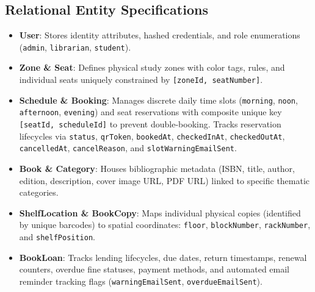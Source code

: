 \subsection{Relational Entity Specifications}
\begin{itemize}
    \item \textbf{User}: Stores identity attributes, hashed credentials, and role enumerations (\texttt{admin}, \texttt{librarian}, \texttt{student}).
    \item \textbf{Zone \& Seat}: Defines physical study zones with color tags, rules, and individual seats uniquely constrained by \texttt{[zoneId, seatNumber]}.
    \item \textbf{Schedule \& Booking}: Manages discrete daily time slots (\texttt{morning}, \texttt{noon}, \texttt{afternoon}, \texttt{evening}) and seat reservations with composite unique key \texttt{[seatId, scheduleId]} to prevent double-booking. Tracks reservation lifecycles via \texttt{status}, \texttt{qrToken}, \texttt{bookedAt}, \texttt{checkedInAt}, \texttt{checkedOutAt}, \texttt{cancelledAt}, \texttt{cancelReason}, and \texttt{slotWarningEmailSent}.
    \item \textbf{Book \& Category}: Houses bibliographic metadata (ISBN, title, author, edition, description, cover image URL, PDF URL) linked to specific thematic categories.
    \item \textbf{ShelfLocation \& BookCopy}: Maps individual physical copies (identified by unique barcodes) to spatial coordinates: \texttt{floor}, \texttt{blockNumber}, \texttt{rackNumber}, and \texttt{shelfPosition}.
    \item \textbf{BookLoan}: Tracks lending lifecycles, due dates, return timestamps, renewal counters, overdue fine statuses, payment methods, and automated email reminder tracking flags (\texttt{warningEmailSent}, \texttt{overdueEmailSent}).
\end{itemize}

